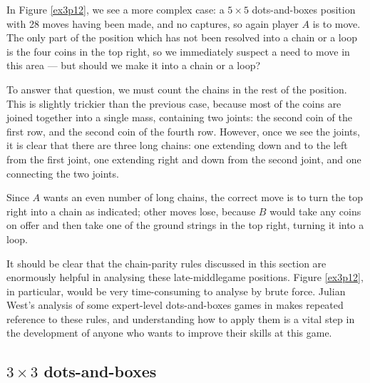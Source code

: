 \documentclass[a4paper,twocolumn]{article}
\begin{document}
\begin{figure*}
  \centering
  \def\svgscale{0.7}
  
  \caption{Exercise 3.1 from \cite{berl}: $A$ to move, solution highlighted}
  \label{ex3p1}
\end{figure*}

In Figure \ref{ex3p12}, we see a more complex case: a $5 \times 5$
dots-and-boxes position with 28 moves having been made, and no
captures, so again player $A$ is to move. The only part of the
position which has not been resolved into a chain or a loop is the
four coins in the top right, so we immediately suspect a need to move
in this area --- but should we make it into a chain or a loop?

\begin{figure*}
  \centering
  \def\svgscale{0.7}
  
  \caption{Exercise 3.12 from \cite{berl}: $A$ to move, solution highlighted}
  \label{ex3p12}
\end{figure*}

To answer that question, we must count the chains in the rest of the
position. This is slightly trickier than the previous case, because
most of the coins are joined together into a single mass, containing
two joints: the second coin of the first row, and the second coin of
the fourth row. However, once we see the joints, it is clear that
there are three long chains: one extending down and to the left from
the first joint, one extending right and down from the second joint,
and one connecting the two joints.

Since $A$ wants an even number of long chains, the correct move is to
turn the top right into a chain as indicated; other moves lose,
because $B$ would take any coins on offer and then take one of the
ground strings in the top right, turning it into a loop.

It should be clear that the chain-parity rules discussed in this
section are enormously helpful in analysing these late-middlegame
positions. Figure \ref{ex3p12}, in particular, would be very
time-consuming to analyse by brute force. Julian West's analysis of
some expert-level dots-and-boxes games in \cite{nochance} makes
repeated reference to these rules, and understanding how to apply them
is a vital step in the development of anyone who wants to improve
their skills at this game.

\subsection{$3 \times 3$ dots-and-boxes}
\end{document}
